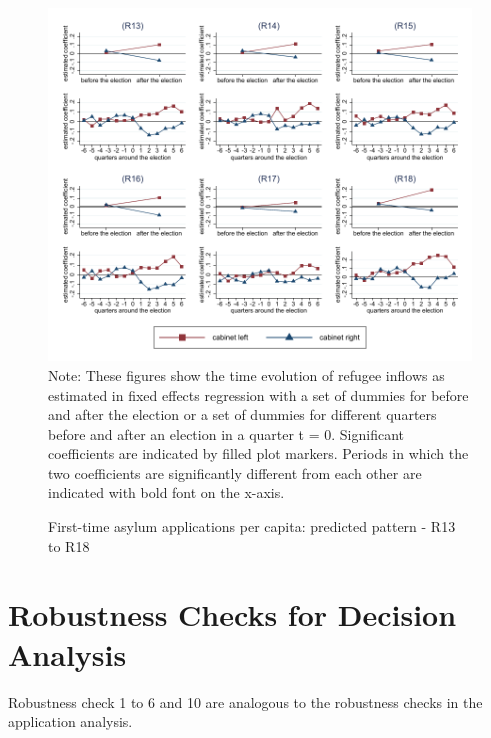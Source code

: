 \documentclass[11pt,a4paper]{scrartcl}
\begin{document}
\clearpage
\FloatBarrier
\begin{figure}[!ht]
	\caption{First-time asylum applications per capita: predicted pattern - R13 to R18}
	\includegraphics[width=1\textwidth]{../results/applications/app_graphs_R13-R18.pdf}
	\scriptsize{Note: These figures show the time evolution of refugee inflows as estimated in fixed effects regression
		with a set of dummies for before and after the election or a set of dummies for different quarters before and after an election in a quarter t = 0. Significant coefficients are indicated by filled plot markers. Periods in which the two coefficients are significantly different from each other are indicated with bold font on the x-axis.}
\end{figure}

\clearpage
\FloatBarrier



\clearpage
\FloatBarrier


\clearpage
\FloatBarrier






\clearpage
\FloatBarrier
\section{Robustness Checks for Decision Analysis}
Robustness check 1 to 6 and 10 are analogous to the robustness checks in the application analysis.
\end{document}
